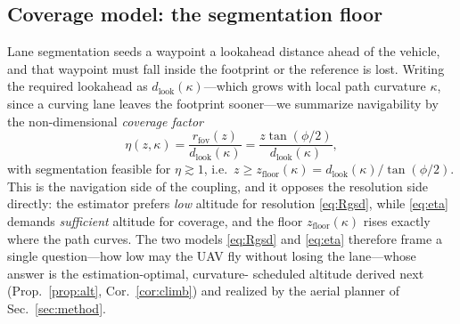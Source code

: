 \subsection{Coverage model: the segmentation floor}
\label{sec:coverage}
Lane segmentation seeds a waypoint a lookahead distance ahead of the vehicle, and that
waypoint must fall inside the footprint or the reference is lost. Writing the required
lookahead as $d_{\mathrm{look}}(\kappa)$---which grows with local path curvature
$\kappa$, since a curving lane leaves the footprint sooner---we summarize navigability
by the non-dimensional \emph{coverage factor}
\begin{equation}
\eta(z,\kappa)=\frac{r_{\mathrm{fov}}(z)}{d_{\mathrm{look}}(\kappa)}
             =\frac{z\tan(\phi/2)}{d_{\mathrm{look}}(\kappa)},
\label{eq:eta}
\end{equation}
with segmentation feasible for $\eta\gtrsim1$, i.e.\ $z\ge
z_{\mathrm{floor}}(\kappa)=d_{\mathrm{look}}(\kappa)/\tan(\phi/2)$. This is the
navigation side of the coupling, and it opposes the resolution side directly: the
estimator prefers \emph{low} altitude for resolution \eqref{eq:Rgsd}, while
\eqref{eq:eta} demands \emph{sufficient} altitude for coverage, and the floor
$z_{\mathrm{floor}}(\kappa)$ rises exactly where the path curves. The two models
\eqref{eq:Rgsd} and \eqref{eq:eta} therefore frame a single question---how low may the
UAV fly without losing the lane---whose answer is the estimation-optimal, curvature-
scheduled altitude derived next (Prop.~\ref{prop:alt}, Cor.~\ref{cor:climb}) and
realized by the aerial planner of Sec.~\ref{sec:method}.
